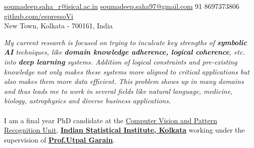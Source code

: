 \documentclass[10pt,a4paper]{article}
\begin{document}
\sloppy


\nobreakvspace{0.3em}

\noindent\href{mailto:soumadeep.saha\_r@isical.ac.in}{soumadeep.saha\_r@isical.ac.in}\sbull
\noindent\href{mailto:soumadeep.saha97@gmail.com}{soumadeep.saha97@gmail.com}\sbull
\textsmaller{+}91 8697373806\sbull
\href{https://github.com/espressoVi}{github.com/espressoVi}\\
New Town, Kolkata - 700161, India

\spacedhrule{0.9em}{-0.4em}


\vspace{-1.3em}  %
\begin{multicols}{2}  %
\noindent \emph{My current research is focused on trying to inculcate key 
    strengths of \textbf{symbolic AI} techniques, like
    \textbf{domain knowledge adherence, logical coherence}, etc. into
    \textbf{deep learning} systems. Addition of logical constraints and
    pre-existing knowledge not only makes these systems more aligned to critical
    applications but also makes them more data efficient. This problem shows up
    in many domains and thus leads me to work in several fields like natural
    language, medicine, biology, astrophysics and diverse business applications.
    }
\\
\\
	I am a final year PhD candidate at the 
    \href{https://cvpru.isical.ac.in/}{Computer Vision and Pattern Recognition 
    Unit}, \href{https://www.isical.ac.in/}{\textbf{Indian Statistical Institute, Kolkata}}
    working under the supervision of 
    \textbf{\href{https://www.isical.ac.in/~utpal}{Prof.\;Utpal Garain}}.
\end{multicols}
\end{document}

